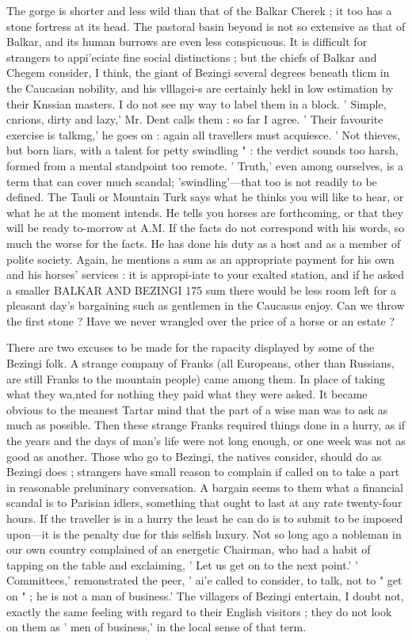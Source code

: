 \documentclass{article}
\begin{document}
	The gorge is shorter and less wild than that of the Balkar Cherek ; it too has a stone fortress at its head. The pastoral basin beyond is not so extensive as that of Balkar, and its human burrows are even less conspicuous. It is difficult for strangers to appi'eciate fine social distinctions ; but the chiefs of Balkar and Chegem consider, I think, the giant of Bezingi
	 several degrees beneath tlicm in the Caucasian nobility, and his vlllagei-s are certainly hekl in low estimation by their Knssian masters. I do not see my way to label them in a block. ' Simple, cnrions, dirty and lazy,' Mr. Dent calls them : so far I agree. ' Their favourite exercise is talkmg,' he goes on : again all travellers must acquiesce. ' Not thieves, but born liars, with a talent for petty swindling " : the verdict sounds too harsh, formed from a mental standpoint too remote. ' Truth,' even among ourselves, is a term that can cover much scandal; 'swindling'—that too is not readily to be defined. The Tauli or Mountain Turk says what he thinks you will like to hear, or what he at the moment intends. He tells you horses are forthcoming, or that they will be ready to-morrow at A.M. If the facts do not correspond with his words, so much the worse for the facts. He has done his duty as a host and as a member of polite society. Again, he mentions a sum as an appropriate payment for his own and his horses' services : it is appropi-iate to your exalted station, and if he asked a smaller BALKAR AND BEZINGI 175 sum there would be less room left for a pleasant day's bargaining such as gentlemen in the Caucasus enjoy. Can we throw the first stone ? Have we never wrangled over the price of a horse or an estate ?
	
	There are two excuses to be made for the rapacity displayed by some of the Bezingi folk. A strange company of Franks (all Europeans, other than Russians, are still Franks to the mountain people) came among them. In place of taking what they wa,nted for nothing they paid what they were asked. It became obvious to the meanest Tartar mind that the part of a wise man was to ask as much as possible. Then these strange Franks required things done in a hurry, as if the years and the days of man's life were not long enough, or one week was not as good as another. Those who go to Bezingi, the natives consider, should do as Bezingi does ; strangers have small reason to complain if called on to take a part in reasonable preluninary conversation. A bargain seems to them what a financial scandal is to Parisian idlers, something that ought to last at any rate twenty-four hours. If the traveller is in a hurry the least he can do is to submit to be imposed upon—it is the penalty due for this selfish luxury. Not so long ago a nobleman in our own country complained of an energetic Chairman, who had a habit of tapping on the table and exclaiming, ' Let us get on to the next point.' ' Committees,' remonstrated the peer, ' ai'e called to consider, to talk, not to " get on " ; he is not a man of business.' The villagers of Bezingi entertain, I doubt not, exactly the same feeling with regard to their English visitors ; they do not look on them as ' men of business,' in the local sense of that term.
	
\end{document}
